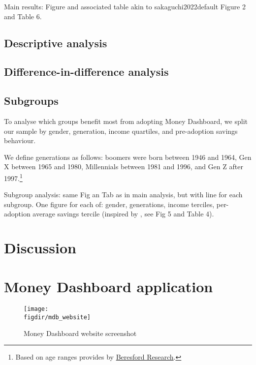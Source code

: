 \documentclass[a4paper, 11pt]{article}
\newcommand{\figdir}{../../output/figures}
\begin{document}
Main results: Figure and associated table akin to sakaguchi2022default Figure 2
and Table 6.

\subsection{Descriptive analysis}%
\label{sub:descriptive_analysis}

\subsection{Difference-in-difference analysis}%
\label{sub:difference_in_difference_analysis}

\subsection{Subgroups}%
\label{sub:subgroups}

To analyse which groups benefit most from adopting Money Dashboard, we split
our sample by gender, generation, income quartiles, and pre-adoption savings
behaviour.

We define generations as follows: boomers were born between 1946 and 1964, Gen
X between 1965 and 1980, Millennials between 1981 and 1996, and Gen Z after
1997.\footnote{Based on age ranges provides by
    \href{https://www.beresfordresearch.com/age-range-by-generation/}{Beresford
Research}.}

Subgroup analysis: same Fig an Tab as in main analysis, but with line for each
subgroup. One figure for each of: gender, generations, income terciles,
per-adoption average savings tercile (inspired by \citet{carlin2017fintech},
see Fig 5 and Table 4).

% 
\section{Discussion}%
\label{sec:discussion}


\newpage
\printbibliography
\newpage

% 
\appendix

\section{Money Dashboard application}%
\label{sec:money_dashboard_application}

\begin{figure}[htpb]
    \centering
    \caption{Money Dashboard website screenshot}%
    \texttt{[image: \\figdir/mdb\_website]}
    \label{fig:mdb_website}
\end{figure}
\end{document}
